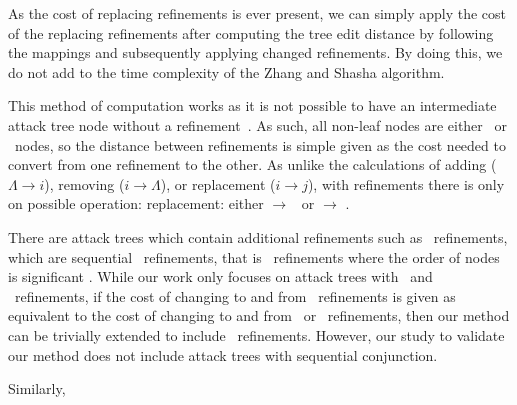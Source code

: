 As the cost of replacing refinements is ever present, we can simply apply the cost of the replacing refinements after computing the tree edit distance by following the mappings and subsequently applying changed refinements. By doing this, we do not add to the time complexity of the Zhang and Shasha algorithm.

This method of computation works as it is not possible to have an intermediate attack tree node without a refinement~\cite{mauw_foundations_2006}. As such, all non-leaf nodes are either \AND\ or \OR\ nodes, so the distance between refinements is simple given as the cost needed to convert from one refinement to the other. As unlike the calculations of adding ($\Lambda \rightarrow i$), removing ($i \rightarrow \Lambda$), or replacement ($i \rightarrow j$), with refinements there is only on possible operation: replacement: either \AND $\rightarrow$ \OR\ or \OR $\rightarrow$ \AND. 

There are attack trees which contain additional refinements such as \SAND\ refinements, which are sequential \AND\ refinements, that is \AND\ refinements where the order of nodes is significant \cite{jhawar_attack_2015}. While our work only focuses on attack trees with \AND\ and \OR\ refinements, if the cost of changing to and from \SAND\ refinements is given as equivalent to the cost of changing to and from \AND\ or \OR\ refinements, then our method can be trivially extended to include \SAND\ refinements. However, our study to validate our method does not include attack trees with sequential conjunction.

Similarly, 

